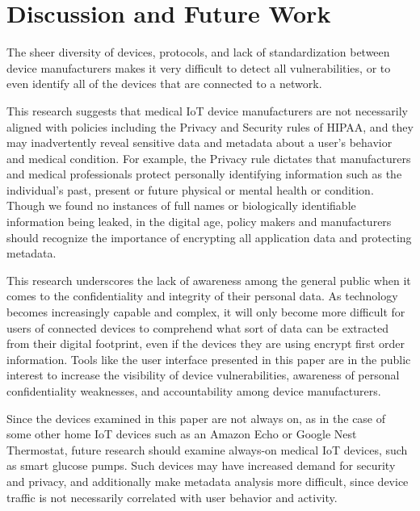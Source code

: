 
\section{Discussion and Future Work}

The sheer diversity of devices, protocols, and lack of standardization between device manufacturers makes it very difficult to detect all vulnerabilities, or to even identify all of the devices that are connected to a network.

This research suggests that medical IoT device manufacturers are not necessarily aligned with policies including the Privacy and Security rules of HIPAA, and they may inadvertently reveal sensitive data and metadata about a user's behavior and medical condition. For example, the Privacy rule dictates that manufacturers and medical professionals protect personally identifying information such as the individual's past, present or future physical or mental health or condition. Though we found no instances of full names or biologically identifiable information being leaked, in the digital age, policy makers and manufacturers should recognize the importance of encrypting all application data and protecting metadata.

This research underscores the lack of awareness among the general public when it comes to the confidentiality and integrity of their personal data. As technology becomes increasingly capable and complex, it will only become more difficult for users of connected devices to comprehend what sort of data can be extracted from their digital footprint, even if the devices they are using encrypt first order information. Tools like the user interface presented in this paper are in the public interest to increase the visibility of device vulnerabilities, awareness of personal confidentiality weaknesses, and accountability among device manufacturers.

Since the devices examined in this paper are not always on, as in the case of some other home IoT devices such as an Amazon Echo or Google Nest Thermostat, future research should examine always-on medical IoT devices, such as smart glucose pumps. Such devices may have increased demand for security and privacy, and additionally make metadata analysis more difficult, since device traffic is not necessarily correlated with user behavior and activity. 

